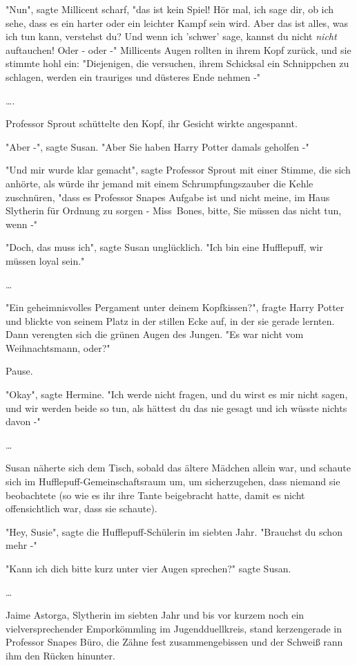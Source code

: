 {"Nun", sagte Millicent scharf, "das ist kein Spiel! Hör mal, ich sage dir, ob ich sehe, dass es ein harter oder ein leichter Kampf sein wird. Aber das ist alles, was ich tun kann, verstehst du? Und wenn ich 'schwer' sage, kannst du nicht \emph{nicht} auftauchen! Oder - oder -" Millicents Augen rollten in ihrem Kopf zurück, und sie stimmte hohl ein: "Diejenigen, die versuchen, ihrem Schicksal ein Schnippchen zu schlagen, werden ein trauriges und düsteres Ende nehmen -"

….

Professor Sprout schüttelte den Kopf, ihr Gesicht wirkte angespannt.

"Aber -", sagte Susan. "Aber Sie haben Harry Potter damals geholfen -"

"Und mir wurde klar gemacht", sagte Professor Sprout mit einer Stimme, die sich anhörte, als würde ihr jemand mit einem Schrumpfungszauber die Kehle zuschnüren, "dass es Professor Snapes Aufgabe ist und nicht meine, im Haus Slytherin für Ordnung zu sorgen - Miss~Bones, bitte, Sie müssen das nicht tun, wenn -"

"Doch, das muss ich", sagte Susan unglücklich. "Ich bin eine Hufflepuff, wir müssen loyal sein."

…

"Ein geheimnisvolles Pergament unter deinem Kopfkissen?", fragte Harry Potter und blickte von seinem Platz in der stillen Ecke auf, in der sie gerade lernten. Dann verengten sich die grünen Augen des Jungen. "Es war nicht vom Weihnachtsmann, oder?"

Pause.

"Okay", sagte Hermine. "Ich werde nicht fragen, und du wirst es mir nicht sagen, und wir werden beide so tun, als hättest du das nie gesagt und ich wüsste nichts davon -"

…

Susan näherte sich dem Tisch, sobald das ältere Mädchen allein war, und schaute sich im Hufflepuff-Gemeinschaftsraum um, um sicherzugehen, dass niemand sie beobachtete (so wie es ihr ihre Tante beigebracht hatte, damit es nicht offensichtlich war, dass sie schaute).

"Hey, Susie", sagte die Hufflepuff-Schülerin im siebten Jahr. "Brauchst du schon mehr -"

"Kann ich dich bitte kurz unter vier Augen sprechen?" sagte Susan.

…

Jaime Astorga, Slytherin im siebten Jahr und bis vor kurzem noch ein vielversprechender Emporkömmling im Jugendduellkreis, stand kerzengerade in Professor Snapes Büro, die Zähne fest zusammengebissen und der Schweiß rann ihm den Rücken hinunter.

}
